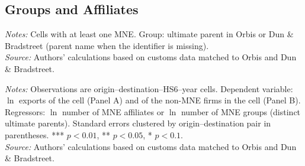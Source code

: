 \documentclass[11pt,a4paper]{article}
\begin{document}
\subsection{Groups and Affiliates}
\begin{table}[H]\centering\small%
  \caption{Multinational Affiliates and Groups in Origin--Destination--Product--Year Cells}%
  \label{tab:grp_all}%
  \par\vspace{3pt}%
  \begin{minipage}{0.95\textwidth}\footnotesize %
  \textit{Notes:} Cells with at least one MNE. Group: ultimate parent in Orbis or Dun \& Bradstreet (parent name when the identifier is missing).\\[3pt]%
  \textit{Source:} Authors' calculations based on customs data matched to Orbis and Dun \& Bradstreet.%
  \end{minipage}%
  \end{table}
\begin{table}[H]\centering\small%
  \caption{Multinational Presence and Exports: Affiliates and Groups}%
  \label{tab:grp_r_all}%
  \par\vspace{3pt}%
  \begin{minipage}{0.95\textwidth}\footnotesize %
  \textit{Notes:} Observations are origin--destination--HS6--year cells. Dependent variable: $\ln$ exports of the cell (Panel A) and of the non-MNE firms in the cell (Panel B). Regressors: $\ln$ number of MNE affiliates or $\ln$ number of MNE groups (distinct ultimate parents). Standard errors clustered by origin--destination pair in parentheses. *** $p<0.01$, ** $p<0.05$, * $p<0.1$.\\[3pt]%
  \textit{Source:} Authors' calculations based on customs data matched to Orbis and Dun \& Bradstreet.%
  \end{minipage}%
  \end{table}
\end{document}
